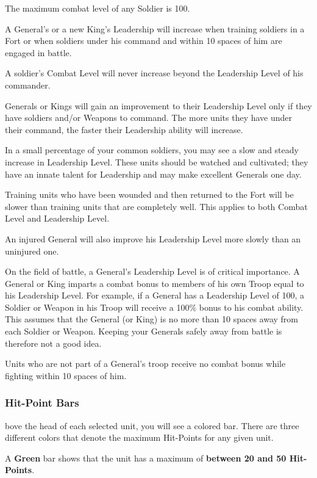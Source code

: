 The maximum combat level of any Soldier is 100.

A General’s or a new King’s Leadership will increase when training soldiers in a Fort or when soldiers under his command and within 10 spaces of him are engaged in battle.

A soldier’s Combat Level will never increase beyond the Leadership Level of his commander.

Generals or Kings will gain an improvement to their Leadership Level only if they have soldiers and/or Weapons to command. The more units they have under their command, the faster their Leadership ability will increase.

In a small percentage of your common soldiers, you may see a slow and steady increase in Leadership Level. These units should be watched and cultivated; they have an innate talent for Leadership and may make excellent Generals one day.

Training units who have been wounded and then returned to the Fort will be slower than training units that are completely well. This applies to both Combat Level and Leadership Level.

An injured General will also improve his Leadership Level more slowly than an uninjured one.

On the field of battle, a General’s Leadership Level is of critical importance. A General or King imparts a combat bonus to members of his own Troop equal to his Leadership Level. For example, if a General has a Leadership Level of 100, a Soldier or Weapon in his Troop will receive a 100\% bonus to his combat ability. This assumes that the General (or King) is no more than 10 spaces away from each Soldier or Weapon. Keeping your Generals safely away from battle is therefore not a good idea.

Units who are not part of a General’s troop receive no combat bonus while fighting within 10 spaces of him.

\subsubsection{\textsf{Hit-Point Bars}}


bove the head of each selected unit, you will see a colored bar. There are three different colors that denote the maximum Hit-Points for any given unit.

A \textbf{Green} bar shows that the unit has a maximum of \textbf{between 20 and 50 Hit-Points}.

